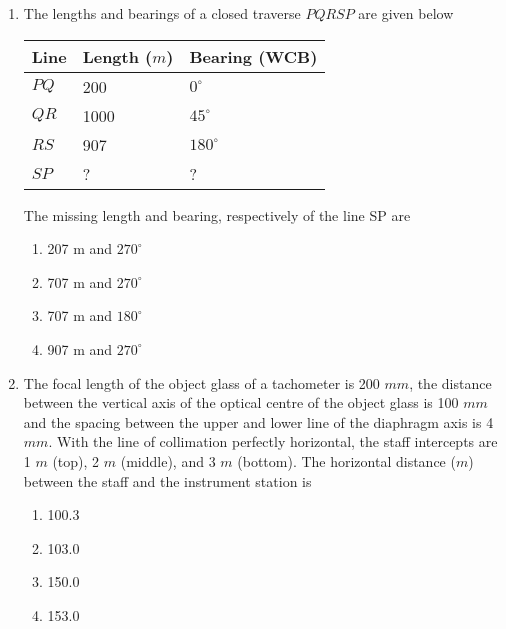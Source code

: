 \documentclass[journal]{IEEEtran}
\begin{document}
\begin{enumerate}
\begin{multicols}{2}
\begin{enumerate}
		\item 10000
		\item 6561
		\item 1000
		\item 656
	\end{enumerate}
\end{multicols}	
	\item The lengths and bearings of a closed traverse $PQRSP$ are given below
\begin{table}[h]
	\centering
\begin{tabular}{|l|l|l|}
	\hline
	 Line & Length ($m$)   &  Bearing (WCB)  \\

	\hline
	$PQ$ & 200 & $0^{\circ}$   \\
	\hline
	$QR$ & 1000  &$45^{\circ}$  \\
	\hline
	$RS$ & 907 & $180^{\circ}$  \\
	\hline
	 $SP$  & ?  & ?  \\
	\hline
	



\end{tabular} 
\end{table}
		
The missing length and bearing, respectively of the line SP are
\begin{multicols}{2}
	\begin{enumerate}
		\item 207 m and $270^{\circ}$
		\item 707 m and $270^{\circ}$
		\item 707 m and $180^{\circ}$
		\item 907 m and $270^{\circ}$
	\end{enumerate}
\end{multicols}	
 \item The focal length of the object glass of a tachometer is 200 $mm$, the distance between the vertical axis of the optical centre of the object glass is 100 $mm$ and the spacing between the upper and lower line of the diaphragm axis is 4 $mm$. With the line of collimation perfectly horizontal, the staff intercepts are 1 $m$ (top), 2 $m$ (middle), and 3 $m$ (bottom). The horizontal distance ($m$) between the staff and the instrument station is 
\begin{multicols}{2}
	\begin{enumerate}
		\item 100.3
		\item 103.0
		\item 150.0
		\item 153.0
	\end{enumerate}
\end{multicols}	


		

\end{enumerate}
\end{document}
